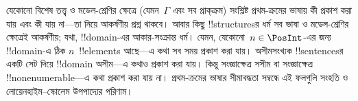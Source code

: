 \documentclass[../../../include/open-logic-section]{subfiles}
\begin{document}
যেকোনো বিশেষ তত্ত্ব ও মডেল-শ্রেণির ক্ষেত্রে (যেমন~$\Gamma$ এবং সব
প্রাক্‌ক্রম) সংশ্লিষ্ট প্রথম-ক্রমের ভাষায় কী প্রকাশ করা যায় এবং কী যায়
না—তা নিয়ে আকর্ষণীয় প্রশ্ন থাকবে। আবার কিছু !!{structure}sর ধর্ম
সব ভাষা ও মডেল-শ্রেণির ক্ষেত্রেই আকর্ষণীয়; যথা, !!{domain}-এর আকার-সংক্রান্ত
ধর্ম। যেমন, যেকোনো~$n \in \PosInt$-এর জন্য !!{domain}-এ ঠিক
$n$~!!{element}s আছে—এ কথা সব সময় প্রকাশ করা যায়। অসীমসংখ্যক
!!{sentence}sর একটি সেট দিয়ে !!{domain} অসীম—এ কথাও প্রকাশ করা যায়।
কিন্তু সংজ্ঞাক্ষেত্র সসীম বা সংজ্ঞাক্ষেত্র !!{nonenumerable}—এ কথা প্রকাশ
করা যায় না। প্রথম-ক্রমের ভাষার সীমাবদ্ধতা সম্বন্ধে এই ফলগুলি সংহতি ও
লোয়েনহাইম--স্কোলেম উপপাদ্যের পরিণাম।
\end{document}
